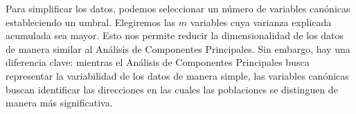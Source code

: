 \noindent Para simplificar los datos, podemos seleccionar un número de variables canónicas estableciendo un umbral. Elegiremos las $m$ variables cuya varianza explicada acumulada sea mayor. Esto nos permite reducir la dimensionalidad de los datos de manera similar al Análisis de Componentes Principales. Sin embargo, hay una diferencia clave: mientras el Análisis de Componentes Principales busca representar la variabilidad de los datos de manera simple, las variables canónicas buscan identificar las direcciones en las cuales las poblaciones se distinguen de manera más significativa.

